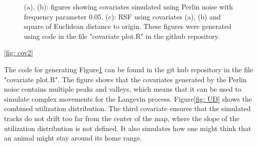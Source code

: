 \begin{figure}[H]%
    \centering
    \qquad
    \qquad
    \caption[covariate and utilization distribution plots]{(a), (b): figures showing covariates simulated using Perlin noise with frequency parameter 0.05. (c): RSF using covariates (a), (b) and square of Euclidean distance to origin. These figures were generated using code in the file "covariate plot.R" in the github repository.}%
    \label{fig:covariate plots}%
\end{figure}

\ref{fig: cov2}

The code for generating Figure\ref{fig:covariate plots} can be found in the git hub repository in the file "covariate plot.R". The figure shows that the covariates generated by the Perlin noise contains multiple peaks and valleys, which means that it can be used to simulate complex movements for the Langevin process. Figure\ref{fig: UD} shows the combined utilization distribution. The third covariate ensures that the simulated tracks do not drift too far from the center of the map, where the slope of the utilization distribution is not defined. It also simulates how one might think that an animal might stay around its home range. 

